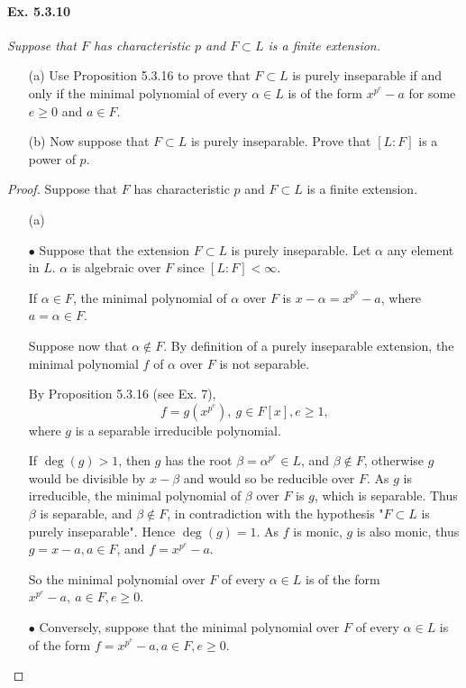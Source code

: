 \documentclass[11pt,a4paper]{article}
\begin{document}
\paragraph{Ex. 5.3.10}

{\it Suppose that $F$ has characteristic $p$ and $F \subset L$ is a finite extension.
\begin{enumerate}
\item[(a)] Use Proposition 5.3.16 to prove that $F\subset L$ is purely inseparable if and only if the minimal polynomial of every $\alpha \in L$ is of the form $x^{p^e} -a$ for some $e\geq 0$ and $a\in F$.
\item[(b)] Now suppose that $F \subset L$ is purely inseparable. Prove that $[L:F]$ is a power of $p$.
\end{enumerate}
}

\begin{proof}
Suppose that $F$ has characteristic $p$ and $F \subset L$ is a finite extension.
\begin{enumerate}
\item[(a)] 

$\bullet$ Suppose that the extension $F \subset L$ is purely inseparable. Let $\alpha$ any element in $L$. $\alpha$ is algebraic over $F$ since $[L : F] < \infty$.

If  $\alpha \in F$, the minimal polynomial of $\alpha$ over $F$ is $x-\alpha = x^{p^0} - a$, where $a = \alpha \in F$. 

Suppose now that $\alpha \not \in F$. By definition of a purely inseparable extension, the minimal polynomial $f$ of $\alpha$ over $F$ is not separable. 

By Proposition 5.3.16 (see Ex. 7),  $${f = g(x^{p^e})},\ g \in F[x], e\geq 1,$$where $g$ is a separable irreducible polynomial.

If $\deg(g)>1$, then $g$ has the root $\beta = \alpha^{p^e} \in L$, and $\beta \not \in F$, otherwise $g$ would be divisible by $x-\beta$ and would so be reducible over $F$. As $g$ is irreducible, the minimal polynomial of $\beta$ over $F$ is $g$, which is separable. Thus $\beta$ is separable, and $\beta \not \in F$, in contradiction with the hypothesis "$F \subset L$ is purely inseparable". Hence $\deg(g) = 1$. As $f$ is monic, $g$ is also monic, thus $g = x-a, a \in F$, and $f = x^{p^e} -a$.

So the minimal polynomial over $F$ of every $\alpha \in L$ is of the form $x^{p^e} -a,\  a\in F, e\geq 0$.

$\bullet$ Conversely, suppose that the minimal polynomial over $F$ of every $\alpha \in L$ is of the form $f=x^{p^e} -a, a\in F, e\geq 0$.


\end{enumerate}
\end{proof}
\end{document}
